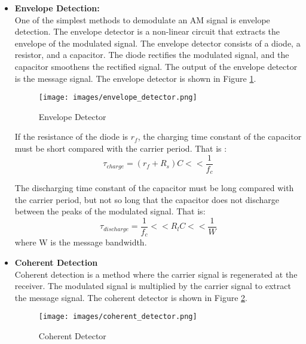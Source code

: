 \begin{itemize}
    \item \textbf{Envelope Detection:}\\
    One of the simplest methods to demodulate an AM signal is envelope detection. The envelope detector is a non-linear circuit that extracts the envelope of the modulated signal. The envelope detector consists of a diode, a resistor, and a capacitor. The diode rectifies the modulated signal, and the capacitor smoothens the rectified signal. The output of the envelope detector is the message signal. The envelope detector is shown in Figure \ref{fig:envelope_detector}.
    \begin{figure}
        \begin{center}
            \texttt{[image: images/envelope\_detector.png]}
            \caption{Envelope Detector}
            \label{fig:envelope_detector}
        \end{center}
    \end{figure}

    If the resistance of the diode is $r_f$, the charging time constant of the capacitor must be short compared with the carrier period. That is : 
    \begin{equation}
        \tau_{charge} = (r_f+ R_s ) C << \frac{1}{f_c}
    \end{equation}

    The discharging time constant of the capacitor must be long compared with the carrier period, but not so long that the capacitor does not discharge between the peaks of the modulated signal. That is:
    \begin{equation}
        \tau_{discharge} =\frac{1}{f_c} << R_l C   << \frac{1}{W}
        \label{eq:discharge_time}
    \end{equation}
    where W is the message bandwidth.
    \item \textbf{Coherent Detection} \\
    Coherent detection is a method where the carrier signal is regenerated at the receiver. The modulated signal is multiplied by the carrier signal to extract the message signal. The coherent detector is shown in Figure \ref{fig:coherent_detector}.
    \begin{figure}
        \begin{center}
            \texttt{[image: images/coherent\_detector.png]}
            \caption{Coherent Detector}
            \label{fig:coherent_detector}
        \end{center}
    \end{figure}
\end{itemize}
